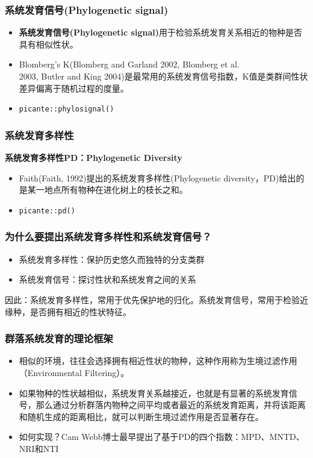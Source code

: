 \documentclass[UTF8]{ctexbeamer}
\begin{document}
\begin{frame}
\frametitle{系统发育信号(Phylogenetic signal)}
\begin{itemize}
\item {\color{blue}\textbf{系统发育信号(Phylogenetic signal)}}用于检验系统发育关系相近的物种是否具有相似性状。
\item Blomberg’s K(Blomberg and Garland 2002, Blomberg et al.\\ 2003, Butler and King 2004)是最常用的系统发育信号指数，K值是类群间性状差异偏离于随机过程的度量。\\
\item {\tt picante::phylosignal()}\\
\end{itemize}
\end{frame}

\begin{frame}
\frametitle{系统发育多样性}
{\color{blue}\textbf{系统发育多样性PD：Phylogenetic Diversity}}\\
\begin{itemize}
\item Faith(Faith, 1992)提出的系统发育多样性(Phylogenetic diversity，PD)给出的是某一地点所有物种在进化树上的枝长之和。\\
\item {\tt picante::pd()}\\
\end{itemize}
\end{frame}

\begin{frame}
\frametitle{为什么要提出系统发育多样性和系统发育信号？}
\begin{itemize}
\item 系统发育多样性：保护历史悠久而独特的分支类群
\item 系统发育信号：探讨性状和系统发育之间的关系
\end{itemize}
因此：系统发育多样性，常用于优先保护地的归化。系统发育信号，常用于检验近缘种，是否拥有相近的性状特征。\\

\end{frame}


\begin{frame}
\frametitle{群落系统发育的理论框架}
\begin{itemize}
\item 相似的环境，往往会选择拥有相近性状的物种，这种作用称为生境过滤作用（Environmental Filtering）。
\item 如果物种的性状越相似，系统发育关系越接近，也就是有显著的系统发育信号，那么通过分析群落内物种之间平均或者最近的系统发育距离，并将该距离和随机生成的距离相比，就可以判断生境过滤作用是否显著存在。
\item 如何实现？Cam Webb博士最早提出了基于PD的四个指数：MPD、MNTD、NRI和NTI
\end{itemize}
\end{frame}
\end{document}
